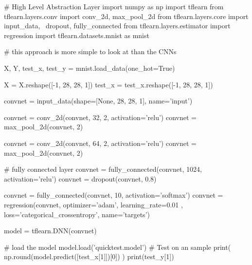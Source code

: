 \documentclass[11pt]{article}
\begin{document}
\begin{python}
# High Level Abstraction Layer
import numpy as np
import tflearn
from tflearn.layers.conv import conv_2d, max_pool_2d
from tflearn.layers.core import input_data, \
    dropout, fully_connected
from tflearn.layers.estimator import regression
import tflearn.datasets.mnist as mnist

# this approach is more simple to look at than the CNNs

X, Y, test_x, test_y = mnist.load_data(one_hot=True)

X = X.reshape([-1, 28, 28, 1])
test_x = test_x.reshape([-1, 28, 28, 1])

convnet = input_data(shape=[None, 28, 28, 1], name='input')

convnet = conv_2d(convnet, 32, 2, activation='relu')
convnet = max_pool_2d(convnet, 2)

convnet = conv_2d(convnet, 64, 2, activation='relu')
convnet = max_pool_2d(convnet, 2)

# fully connected layer
convnet = fully_connected(convnet, 1024, activation='relu')
convnet = dropout(convnet, 0.8)

convnet = fully_connected(convnet, 10, activation='softmax')
convnet = regression(convnet, optimizer='adam', learning_rate=0.01
                     , loss='categorical_crossentropy',
                     name='targets')

model = tflearn.DNN(convnet)

# load the model
model.load('quicktest.model')
# Test on an sample
print( np.round(model.predict([test_x[1]])[0]) )
print(test_y[1])
\end{python}{}
\clearpage
\end{document}
